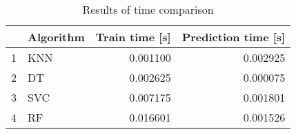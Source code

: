 \begin{table}
\footnotesize
\caption{Results of time comparison}
\label{tab:time comparison}
\begin{tabular}{llrr}
\hline
 & Algorithm & Train time [s] & Prediction time [s] \\
\hline
1 & KNN & 0.001100 & 0.002925 \\
2 & DT & 0.002625 & 0.000075 \\
3 & SVC & 0.007175 & 0.001801 \\
4 & RF & 0.016601 & 0.001526 \\
\hline
\end{tabular}
\end{table}

